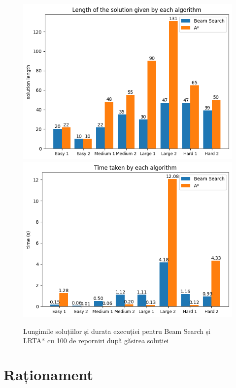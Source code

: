 \documentclass{article}
\begin{document}
\begin{figure}
    \includegraphics[scale=0.45]{solution/enhanced_astar/solution_length.png}
    \includegraphics[scale=0.45]{solution/enhanced_astar/time.png}
    \caption{Lungimile soluțiilor și durata execuției pentru Beam Search și 
    LRTA* cu 100 de reporniri după găsirea soluției}
    \label{fig:enhanced_astar}
\end{figure}

\newpage
\section{Raționament}
\end{document}
